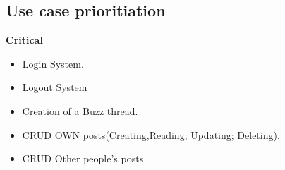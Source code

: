 \documentclass[a4paper,12pt]{report}
\begin{document}
\subsection{Use case prioritiation}
\textbf{Critical} 
\begin{itemize}
  \item Login System.
	\begin{center}
	\end{center}
  \item Logout System
	\begin{center}
	\end{center}	
  \item Creation of a Buzz thread.
  	\begin{center}
	\end{center}	
    \item CRUD OWN posts(Creating,Reading; Updating; Deleting).
	\begin{center}
	\end{center}
\item CRUD Other people's posts 
	\begin{center}
	\end{center}\end{itemize} 
\end{document}
